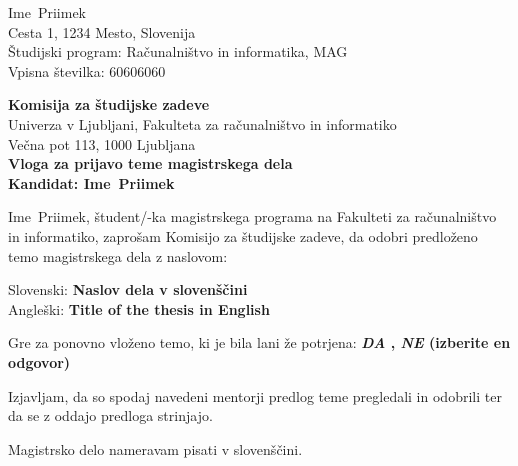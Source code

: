 \documentclass[a4paper, 12pt]{article}
\begin{document}
\newcommand{\ImeKandidata}{Ime} %
\newcommand{\PriimekKandidata}{Priimek} %
\newcommand{\VpisnaStevilka}{60606060 } %
\newcommand{\StudijskiProgram}{Računalništvo in informatika, MAG} %
\newcommand{\NaslovBivalisca}{ Cesta 1, 1234 Mesto, Slovenija } %
\newcommand{\SLONaslov}{Naslov dela v slovenščini} %
\newcommand{\ENGNaslov}{Title of the thesis in English} %


\newcommand{\Kandidat}{\ImeKandidata~\PriimekKandidata}
\noindent
\Kandidat\\
\NaslovBivalisca \\
Študijski program: \StudijskiProgram \\
Vpisna številka: \VpisnaStevilka
\bigskip

{\bf Komisija za študijske zadeve}\\
Univerza v Ljubljani, Fakulteta za računalništvo in informatiko\\
Večna pot 113, 1000 Ljubljana\\

{\Large\bf
{\centering
    Vloga za prijavo teme magistrskega dela \\%
\large Kandidat: \Kandidat \\[10mm]}}


\Kandidat, študent/-ka magistrskega programa na Fakulteti za računalništvo in informatiko, zaprošam Komisijo za študijske zadeve, da odobri predloženo temo magistrskega dela z naslovom:

Slovenski: {\bf \SLONaslov}\\
Angleški: {\bf \ENGNaslov}

Gre za ponovno vloženo temo, ki je bila lani že potrjena: {\bf \textit{DA} , \textit{NE} (izberite en odgovor) }

Izjavljam, da so spodaj navedeni mentorji predlog teme pregledali in odobrili ter da se z oddajo predloga strinjajo.

Magistrsko delo nameravam pisati v slovenščini. %
\end{document}
